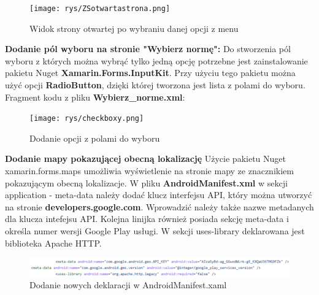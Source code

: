 \newline \newline
\begin{figure}[!htb]
	\begin{center}
		\texttt{[image: rys/ZSotwartastrona.png]}
		\caption{Widok strony otwartej po wybraniu danej opcji z menu}
		\label{rys:rysunek014}
	\end{center}
\end{figure}
 \newline
 \textbf{Dodanie pól wyboru na stronie "Wybierz normę":} \newline
 Do stworzenia pól wyboru z których można wybrąć tylko jedną opcję potrzebne jest zainstalowanie pakietu Nuget \textbf{Xamarin.Forms.InputKit}. Przy użyciu tego pakietu można użyć opcji \textbf{RadioButton}, dzięki której tworzona jest lista z polami do wyboru. \newline \newline
 Fragment kodu z pliku \textbf{Wybierz\_norme.xml}: \newline
 \begin{figure}[!htb]
 	\begin{center}
 		\texttt{[image: rys/checkboxy.png]}
 		\caption{Dodanie opcji z polami do wyboru}
 		\label{rys:rysunek015}
 	\end{center}
 \end{figure}
 

 \textbf{Dodanie mapy pokazującej obecną lokalizację}
 \newline
 Użycie pakietu Nuget xamarin.forms.maps umożliwia wyświetlenie na stronie mapy ze znacznikiem pokazującym obecną lokalizacje.
 \newline 
 W pliku \textbf{AndroidManifest.xml} w sekcji application - meta-data należy dodać klucz interfejsu API, który można utworzyć na stronie \textbf{developers.google.com}. Wprowadzić należy także nazwe metadanych dla klucza intefejsu API.
 Kolejna linijka również posiada sekcję meta-data i określa numer wersji Google Play usługi. W sekcji uses-library deklarowana jest biblioteka Apache HTTP.

 \begin{figure}[!htb]
 	\begin{center}
 		\includegraphics[width=18cm]{rys/map_manifest.png}
 		\caption{Dodanie nowych deklaracji w AndroidManifest.xaml}
 		\label{rys:rysunek016}
 	\end{center}
 \end{figure}
 
